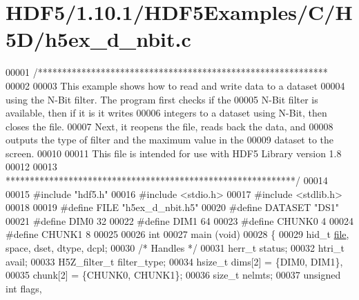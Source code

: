 \hypertarget{_h_d_f5_21_810_81_2_h_d_f5_examples_2_c_2_h5_d_2h5ex__d__nbit_8c_source}{}\section{H\+D\+F5/1.10.1/\+H\+D\+F5\+Examples/\+C/\+H5\+D/h5ex\+\_\+d\+\_\+nbit.c}
\label{_h_d_f5_21_810_81_2_h_d_f5_examples_2_c_2_h5_d_2h5ex__d__nbit_8c_source}

\begin{DoxyCode}
00001 \textcolor{comment}{/************************************************************}
00002 \textcolor{comment}{}
00003 \textcolor{comment}{  This example shows how to read and write data to a dataset}
00004 \textcolor{comment}{  using the N-Bit filter.  The program first checks if the}
00005 \textcolor{comment}{  N-Bit filter is available, then if it is it writes}
00006 \textcolor{comment}{  integers to a dataset using N-Bit, then closes the file.}
00007 \textcolor{comment}{  Next, it reopens the file, reads back the data, and}
00008 \textcolor{comment}{  outputs the type of filter and the maximum value in the}
00009 \textcolor{comment}{  dataset to the screen.}
00010 \textcolor{comment}{}
00011 \textcolor{comment}{  This file is intended for use with HDF5 Library version 1.8}
00012 \textcolor{comment}{}
00013 \textcolor{comment}{ ************************************************************/}
00014 
00015 \textcolor{preprocessor}{#include "hdf5.h"}
00016 \textcolor{preprocessor}{#include <stdio.h>}
00017 \textcolor{preprocessor}{#include <stdlib.h>}
00018 
00019 \textcolor{preprocessor}{#define FILE            "h5ex\_d\_nbit.h5"}
00020 \textcolor{preprocessor}{#define DATASET         "DS1"}
00021 \textcolor{preprocessor}{#define DIM0            32}
00022 \textcolor{preprocessor}{#define DIM1            64}
00023 \textcolor{preprocessor}{#define CHUNK0          4}
00024 \textcolor{preprocessor}{#define CHUNK1          8}
00025 
00026 \textcolor{keywordtype}{int}
00027 main (\textcolor{keywordtype}{void})
00028 \{
00029     hid\_t           \hyperlink{structfile}{file}, space, dset, dtype, dcpl;
00030                                                 \textcolor{comment}{/* Handles */}
00031     herr\_t          status;
00032     htri\_t          avail;
00033     H5Z\_filter\_t    filter\_type;
00034     hsize\_t         dims[2] = \{DIM0, DIM1\},
00035                     chunk[2] = \{CHUNK0, CHUNK1\};
00036     \textcolor{keywordtype}{size\_t}          nelmts;
00037     \textcolor{keywordtype}{unsigned} \textcolor{keywordtype}{int}    flags,

\end{DoxyCode}
